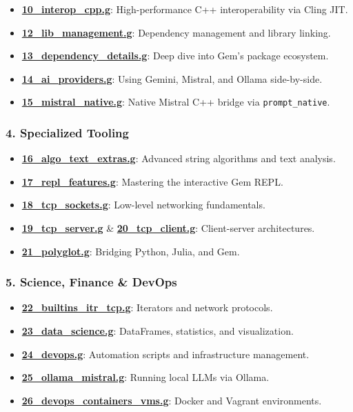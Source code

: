 \documentclass[
]{article}
\providecommand{\tightlist}{%
  \setlength{\itemsep}{0pt}\setlength{\parskip}{0pt}}
\begin{document}
\begin{itemize}
\tightlist
\item
  \textbf{\url{10_interop_cpp.g}}: High-performance C++ interoperability
  via Cling JIT.
\item
  \textbf{\url{12_lib_management.g}}: Dependency management and library
  linking.
\item
  \textbf{\url{13_dependency_details.g}}: Deep dive into Gem's package
  ecosystem.
\item
  \textbf{\url{14_ai_providers.g}}: Using Gemini, Mistral, and Ollama
  side-by-side.
\item
  \textbf{\url{15_mistral_native.g}}: Native Mistral C++ bridge via
  \texttt{prompt\_native}.
\end{itemize}

\subsubsection{4. Specialized Tooling}\label{specialized-tooling}

\begin{itemize}
\tightlist
\item
  \textbf{\url{16_algo_text_extras.g}}: Advanced string algorithms and
  text analysis.
\item
  \textbf{\url{17_repl_features.g}}: Mastering the interactive Gem REPL.
\item
  \textbf{\url{18_tcp_sockets.g}}: Low-level networking fundamentals.
\item
  \textbf{\url{19_tcp_server.g}} \& \textbf{\url{20_tcp_client.g}}:
  Client-server architectures.
\item
  \textbf{\url{21_polyglot.g}}: Bridging Python, Julia, and Gem.
\end{itemize}

\subsubsection{5. Science, Finance \&
DevOps}\label{science-finance-devops}

\begin{itemize}
\tightlist
\item
  \textbf{\url{22_builtins_itr_tcp.g}}: Iterators and network protocols.
\item
  \textbf{\url{23_data_science.g}}: DataFrames, statistics, and
  visualization.
\item
  \textbf{\url{24_devops.g}}: Automation scripts and infrastructure
  management.
\item
  \textbf{\url{25_ollama_mistral.g}}: Running local LLMs via Ollama.
\item
  \textbf{\url{26_devops_containers_vms.g}}: Docker and Vagrant
  environments.
\end{itemize}
\end{document}
